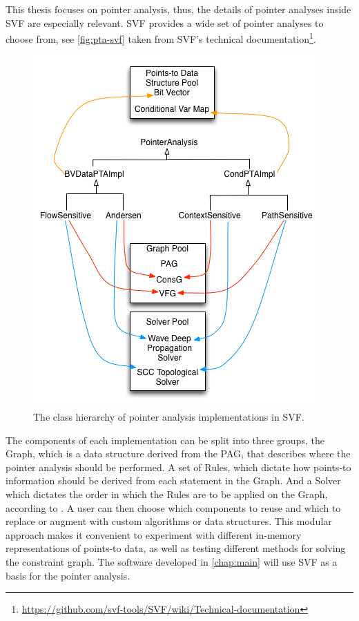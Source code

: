 This thesis focuses on pointer analysis, thus, the details of pointer analyses inside SVF are especially relevant. SVF provides a wide set of pointer analyses to choose from, see \autoref{fig:pta-svf} taken from SVF's technical documentation\footnote{\url{https://github.com/svf-tools/SVF/wiki/Technical-documentation}}.
\begin{figure}
    \centering
    \includegraphics[width=.6\textwidth]{img/pta-svf.png}
    \caption{The class hierarchy of pointer analysis implementations in SVF.}
    \label{fig:pta-svf}
\end{figure}
The components of each implementation can be split into three groups, the Graph, which is a data structure derived from the PAG, that describes where the pointer analysis should be performed.
A set of Rules, which dictate how points-to information should be derived from each statement in the Graph. And a Solver which dictates the order in which the Rules are to be applied on the Graph, according to \cite{sui2016svf}.
A user can then choose which components to reuse and which to replace or augment with custom algorithms or data structures.
This modular approach makes it convenient to experiment with different in-memory representations of points-to data, as well as testing different methods for solving the constraint graph.
The software developed in \autoref{chap:main} will use SVF as a basis for the pointer analysis.

